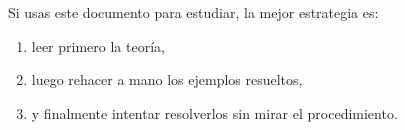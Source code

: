 \documentclass[11pt]{article}
\begin{document}
Si usas este documento para estudiar, la mejor estrategia es:
\begin{enumerate}[label=\arabic*.]
\item leer primero la teor\'ia,
\item luego rehacer a mano los ejemplos resueltos,
\item y finalmente intentar resolverlos sin mirar el procedimiento.
\end{enumerate}
\end{document}
